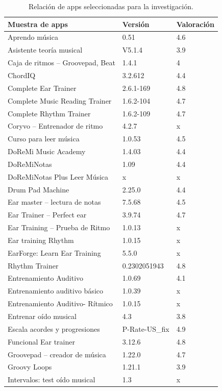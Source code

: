 \documentclass[spanish]{textolivre}
\begin{document}
\begin{longtable}{p{7cm} p{4cm} p{2cm}}
\caption{Relación de apps seleccionadas para la investigación.}\label{tab-1} \\
\toprule
Muestra de apps & Versión & Valoración \\
\midrule
\endhead

Aprendo música & 0.51 & 4.6 \\
Asistente teoría musical & V5.1.4 & 3.9 \\
Caja de ritmos -- Groovepad, Beat & 1.4.1 & 4 \\
ChordIQ & 3.2.612 & 4.4 \\
Complete Ear Trainer & 2.6.1-169 & 4.8 \\
Complete Music Reading Trainer & 1.6.2-104 & 4.7 \\
Complete Rhythm Trainer & 1.6.2-109 & 4.7 \\
Coryvo -- Entrenador de ritmo & 4.2.7 & x \\
Curso para leer música & 1.0.53 & 4.5 \\
DoReMi Music Academy & 1.4.03 & 4.4 \\
DoReMiNotas & 1.09 & 4.4 \\
DoReMiNotas Plus Leer Música & x & x \\
Drum Pad Machine & 2.25.0 & 4.4 \\
Ear master -- lectura de notas & 7.5.68 & 4.5 \\
Ear Trainer -- Perfect ear & 3.9.74 & 4.7 \\
Ear Training -- Prueba de Ritmo & 1.0.13 & x \\
Ear training Rhythm & 1.0.15 & x \\
EarForge: Learn Ear Training & 5.5.0 & x \\
Rhythm Trainer & 0.2302051943 & 4.8 \\
Entrenamiento Auditivo & 1.0.69 & 4.1 \\
Entrenamiento auditivo básico & 1.0.39 & x \\
Entrenamiento Auditivo- Rítmico & 1.0.15 & x \\
Entrenar oído musical & 4.3 & 3.8 \\
Escala acordes y progresiones & P-Rate-US\_fix & 4.9 \\
Funcional Ear trainer & 3.12.6 & 4.8 \\
Groovepad -- creador de música & 1.22.0 & 4.7 \\
Groovy Loops & 1.21.1 & 3.9 \\
Intervalos: test oído musical & 1.3 & x \\

\end{longtable}
\end{document}
